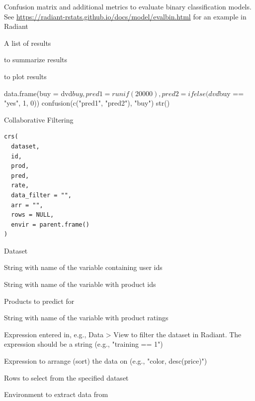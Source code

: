 \documentclass[a4paper]{book}
\begin{document}
%
\begin{Details}
Confusion matrix and additional metrics to evaluate binary classification models. See \url{https://radiant-rstats.github.io/docs/model/evalbin.html} for an example in Radiant
\end{Details}
%
\begin{Value}
A list of results
\end{Value}
%
\begin{SeeAlso}
 to summarize results

 to plot results
\end{SeeAlso}
%
\begin{Examples}
\begin{ExampleCode}
data.frame(buy = dvd$buy, pred1 = runif(20000), pred2 = ifelse(dvd$buy == "yes", 1, 0)) %
  confusion(c("pred1", "pred2"), "buy") %
  str()
\end{ExampleCode}
\end{Examples}
%
\begin{Description}
Collaborative Filtering
\end{Description}
%
\begin{Usage}
\begin{verbatim}
crs(
  dataset,
  id,
  prod,
  pred,
  rate,
  data_filter = "",
  arr = "",
  rows = NULL,
  envir = parent.frame()
)
\end{verbatim}
\end{Usage}
%
\begin{Arguments}
\begin{ldescription}
\item[\code{dataset}] Dataset

\item[\code{id}] String with name of the variable containing user ids

\item[\code{prod}] String with name of the variable with product ids

\item[\code{pred}] Products to predict for

\item[\code{rate}] String with name of the variable with product ratings

\item[\code{data\_filter}] Expression entered in, e.g., Data > View to filter the dataset in Radiant. The expression should be a string (e.g., "training == 1")

\item[\code{arr}] Expression to arrange (sort) the data on (e.g., "color, desc(price)")

\item[\code{rows}] Rows to select from the specified dataset

\item[\code{envir}] Environment to extract data from
\end{ldescription}
\end{Arguments}
\end{document}
